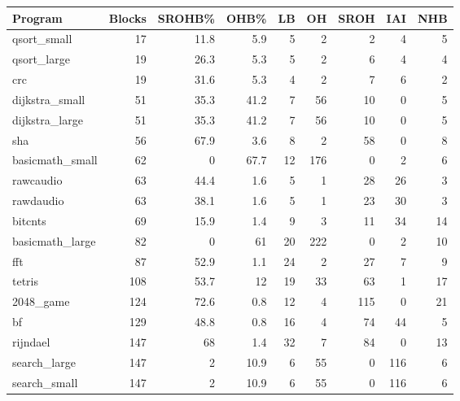 \begin{tabular}{|l|r|r|r|r|r|r|r|r|}
\hline
 Program         &   Blocks &   SROHB\% &   OHB\% &   LB &   OH &   SROH &   IAI &   NHB \\
\hline
 qsort\_small     &       17 &     11.8 &    5.9 &    5 &    2 &      2 &     4 &     5 \\
\hline
 qsort\_large     &       19 &     26.3 &    5.3 &    5 &    2 &      6 &     4 &     4 \\
\hline
 crc             &       19 &     31.6 &    5.3 &    4 &    2 &      7 &     6 &     2 \\
\hline
 dijkstra\_small  &       51 &     35.3 &   41.2 &    7 &   56 &     10 &     0 &     5 \\
\hline
 dijkstra\_large  &       51 &     35.3 &   41.2 &    7 &   56 &     10 &     0 &     5 \\
\hline
 sha             &       56 &     67.9 &    3.6 &    8 &    2 &     58 &     0 &     8 \\
\hline
 basicmath\_small &       62 &      0   &   67.7 &   12 &  176 &      0 &     2 &     6 \\
\hline
 rawcaudio       &       63 &     44.4 &    1.6 &    5 &    1 &     28 &    26 &     3 \\
\hline
 rawdaudio       &       63 &     38.1 &    1.6 &    5 &    1 &     23 &    30 &     3 \\
\hline
 bitcnts         &       69 &     15.9 &    1.4 &    9 &    3 &     11 &    34 &    14 \\
\hline
 basicmath\_large &       82 &      0   &   61   &   20 &  222 &      0 &     2 &    10 \\
\hline
 fft             &       87 &     52.9 &    1.1 &   24 &    2 &     27 &     7 &     9 \\
\hline
 tetris          &      108 &     53.7 &   12   &   19 &   33 &     63 &     1 &    17 \\
\hline
 2048\_game       &      124 &     72.6 &    0.8 &   12 &    4 &    115 &     0 &    21 \\
\hline
 bf              &      129 &     48.8 &    0.8 &   16 &    4 &     74 &    44 &     5 \\
\hline
 rijndael        &      147 &     68   &    1.4 &   32 &    7 &     84 &     0 &    13 \\
\hline
 search\_large    &      147 &      2   &   10.9 &    6 &   55 &      0 &   116 &     6 \\
\hline
 search\_small    &      147 &      2   &   10.9 &    6 &   55 &      0 &   116 &     6 \\

\end{tabular}
